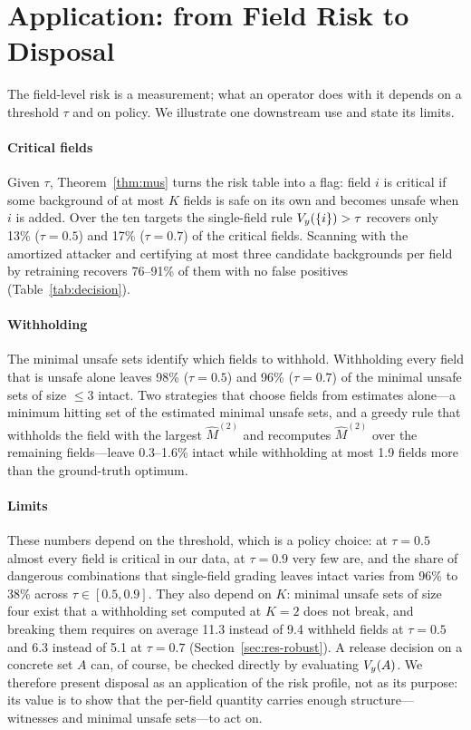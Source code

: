 \section{Application: from Field Risk to Disposal}\label{sec:application}

The field-level risk is a measurement; what an operator does with it depends on a threshold $\tau$
and on policy. We illustrate one downstream use and state its limits.

\paragraph{Critical fields}
Given $\tau$, Theorem~\ref{thm:mus} turns the risk table into a flag: field $i$ is critical if some
background of at most $K$ fields is safe on its own and becomes unsafe when $i$ is added. Over the ten
targets the single-field rule $V_{y}(\{i\})>\tau$ recovers only 13\% ($\tau=0.5$) and 17\% ($\tau=0.7$) of
the critical fields. Scanning with the amortized attacker and certifying at most three candidate
backgrounds per field by retraining recovers 76--91\% of them with no false positives
(Table~\ref{tab:decision}).

\paragraph{Withholding}
The minimal unsafe sets identify which fields to withhold. Withholding every field that is unsafe
alone leaves 98\% ($\tau=0.5$) and 96\% ($\tau=0.7$) of the minimal unsafe sets of size $\le3$ intact.
Two strategies that choose fields from estimates alone---a minimum hitting set of the estimated
minimal unsafe sets, and a greedy rule that withholds the field with the largest $\hat M^{(2)}$ and
recomputes $\hat M^{(2)}$ over the remaining fields---leave 0.3--1.6\% intact while withholding at most
1.9 fields more than the ground-truth optimum.

\paragraph{Limits}
These numbers depend on the threshold, which is a policy choice: at $\tau=0.5$ almost every field is
critical in our data, at $\tau=0.9$ very few are, and the share of dangerous combinations that
single-field grading leaves intact varies from 96\% to 38\% across $\tau\in[0.5,0.9]$. They also depend
on $K$: minimal unsafe sets of size four exist that a withholding set computed at $K=2$ does not break,
and breaking them requires on average 11.3 instead of 9.4 withheld fields at $\tau=0.5$ and 6.3 instead
of 5.1 at $\tau=0.7$ (Section~\ref{sec:res-robust}). A release decision on a concrete set $A$ can, of
course, be checked directly by evaluating $V_{y}(A)$. We therefore present disposal as an application of
the risk profile, not as its purpose: its value is to show that the per-field quantity carries enough
structure---witnesses and minimal unsafe sets---to act on.



